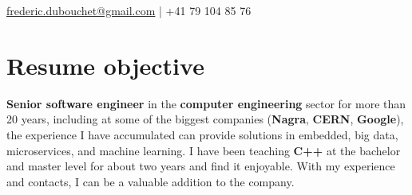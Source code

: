 \documentclass[a4paper]{deedy-resume} %
\begin{document}
\lastupdated


	{\href{mailto:frederic.dubouchet@gmail.com}{frederic.dubouchet@gmail.com} | +41 79 104 85 76}

\section{Resume objective}

\begin{flushleft}
	\textbf{Senior software engineer} in the \textbf{computer engineering} sector for more than 
	20 years, including at some of the biggest companies (\textbf{Nagra}, \textbf{CERN}, 
	\textbf{Google}), the experience I have accumulated can provide solutions in embedded, big data,
	microservices, and machine learning. I have been teaching \textbf{C++} at the bachelor 
	and master level for about two years and find it enjoyable. With my experience and contacts, 
	I can be a valuable addition to the company.
\end{flushleft}


\noindent\makebox[\linewidth]{\color{headings}\rule{\paperwidth}{0.4pt}}

\end{document}
